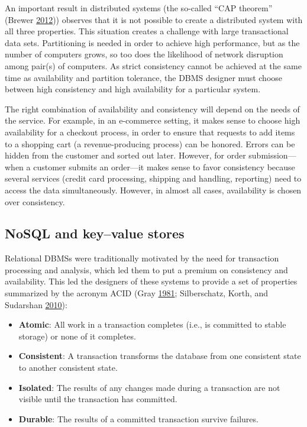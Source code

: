 \documentclass[]{krantz}
\begin{document}
An important result in distributed systems (the so-called ``CAP
theorem'' (Brewer \protect\hyperlink{ref-brewer2012cap}{2012})) observes
that it is not possible to create a distributed system with all three
properties. This situation creates a challenge with large transactional
data sets. Partitioning is needed in order to achieve high performance,
but as the number of computers grows, so too does the likelihood of
network disruption among pair(s) of computers. As strict consistency
cannot be achieved at the same time as availability and partition
tolerance, the DBMS designer must choose between high consistency and
high availability for a particular system.

The right combination of availability and consistency will depend on the
needs of the service. For example, in an e-commerce setting, it makes
sense to choose high availability for a checkout process, in order to
ensure that requests to add items to a shopping cart (a
revenue-producing process) can be honored. Errors can be hidden from the
customer and sorted out later. However, for order submission---when a
customer submits an order---it makes sense to favor consistency because
several services (credit card processing, shipping and handling,
reporting) need to access the data simultaneously. However, in almost
all cases, availability is chosen over consistency.

\subsection{NoSQL and key--value
stores}\label{nosql-and-keyvalue-stores}

Relational DBMSs were traditionally motivated by the need for
transaction processing and analysis, which led them to put a premium on
consistency and availability. This led the designers of these systems to
provide a set of properties summarized by the acronym ACID (Gray
\protect\hyperlink{ref-gray1981transaction}{1981}; Silberschatz, Korth,
and Sudarshan \protect\hyperlink{ref-silberschatz2010database}{2010}):

\begin{itemize}
\item
  \textbf{Atomic}: All work in a transaction completes (i.e., is
  committed to stable storage) or none of it completes.
\item
  \textbf{Consistent}: A transaction transforms the database from one
  consistent state to another consistent state.
\item
  \textbf{Isolated}: The results of any changes made during a
  transaction are not visible until the transaction has committed.
\item
  \textbf{Durable}: The results of a committed transaction survive
  failures.
\end{itemize}
\end{document}
